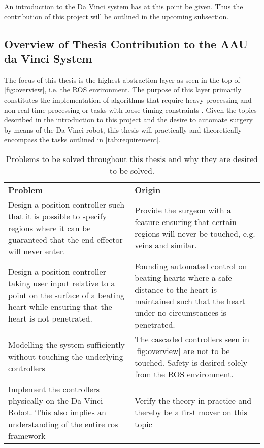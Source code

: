 An introduction to the Da Vinci system has at this point be given. Thus the contribution of this project will be outlined in the upcoming subsection.
\subsection{Overview of Thesis Contribution to the AAU da Vinci System}\label{sec:project_overview}
The focus of this thesis is the highest abstraction layer as seen in the top of \autoref{fig:overview}, i.e. the ROS environment. The purpose of this layer primarily constitutes the implementation of algorithms that require heavy processing and non real-time processing or tasks with loose timing constraints \citep{bib:robot_paper}.
Given the topics described in the introduction to this project and the desire to automate surgery by means of the Da Vinci robot, this thesis will practically and theoretically encompass the tasks outlined in \autoref{tab:requirement}.
\begin{table}[H]
\begin{tabularx}{\textwidth}{X X}
\rowcolor{HeaderBlue} 
\textbf{Problem} &  \textbf{Origin}\\
Design a position controller such that it is possible to specify regions where it can be guaranteed that the end-effector will never enter. & Provide the surgeon with a feature ensuring that certain regions will never be touched, e.g. veins and similar. \\
\rowcolor{textBlue} 
Design a position controller taking  user input relative to a point on the surface of a beating heart while ensuring that the heart is not penetrated. & Founding automated control on beating hearts where a safe distance to the heart is maintained such that the heart under no circumstances is penetrated.\\
Modelling the system sufficiently without touching the underlying controllers & The cascaded controllers seen in \autoref{fig:overview} are not to be touched. Safety is desired solely from the ROS environment. \\
\rowcolor{textBlue} 
Implement the controllers physically on the Da Vinci Robot. This also implies an understanding of the entire \gls{ros} framework & Verify the theory in practice and thereby be a first mover on this topic \\
\end{tabularx}
	\caption{Problems to be solved throughout this thesis and why they are desired to be solved.}
\label{tab:requirement}
\end{table}
